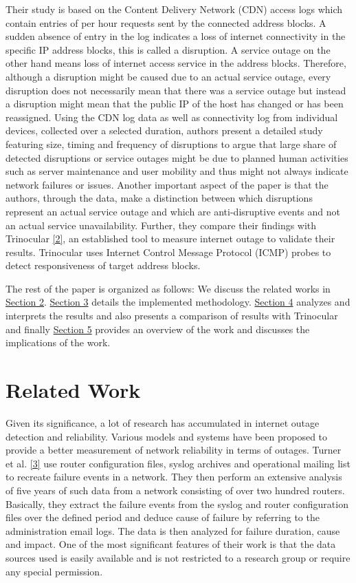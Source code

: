 \documentclass[11pt,twoside,a4paper]{article}
\begin{document}
Their study is based on the Content Delivery Network (CDN) access logs which contain entries of per hour requests sent by the connected address blocks. A sudden absence of entry in the log indicates a loss of internet connectivity in the specific IP address blocks, this is called a disruption. A service outage on the other hand means loss of internet access service in the address blocks. Therefore, although a disruption might be caused due to an actual service outage, every disruption does not necessarily mean that there was a service outage but instead a disruption might mean that the public IP of the host has changed or has been reassigned. Using the CDN log data as well as connectivity log from individual devices, collected over a selected duration, authors present a detailed study featuring size, timing and frequency of disruptions to argue that large share of detected disruptions or service outages might be due to planned human activities such as server maintenance and user mobility and thus might not always indicate network failures or issues. Another important aspect of the paper is that the authors, through the data, make a distinction between which disruptions represent an actual service outage and which are anti-disruptive events and not an actual service unavailability. Further, they compare their findings with Trinocular \hyperlink {K2}{[2]}, an established tool to measure internet outage to validate their results. Trinocular uses Internet Control Message Protocol (ICMP) probes to detect responsiveness of target address blocks.

The rest of the paper is organized as follows: We discuss the related works in \hyperref[RW]{Section 2}. \hyperref[M]{Section 3} details the implemented methodology. \hyperref[RandEv]{Section 4} analyzes and interprets the results and also presents a comparison of results with Trinocular and finally \hyperref[DC]{Section 5} provides an overview of the work and discusses the implications of the work.

\section{Related Work}\label{RW}
Given its significance, a lot of research has accumulated in internet outage detection and reliability. Various models and systems have been proposed to provide a better measurement of network reliability in terms of outages. Turner et al. \hyperlink {K3} {[3]} use router configuration files, syslog archives and operational mailing list to recreate failure events in a network. They then perform an extensive analysis of five years of such data from a network consisting of over two hundred routers. Basically, they extract the failure events from the syslog and router configuration files over the defined period and deduce cause of failure by referring to the administration email logs. The data is then analyzed for failure duration, cause and impact. One of the most significant features of their work is that the data sources used is easily available and is not restricted to a research group or require any special permission. 
\end{document}
